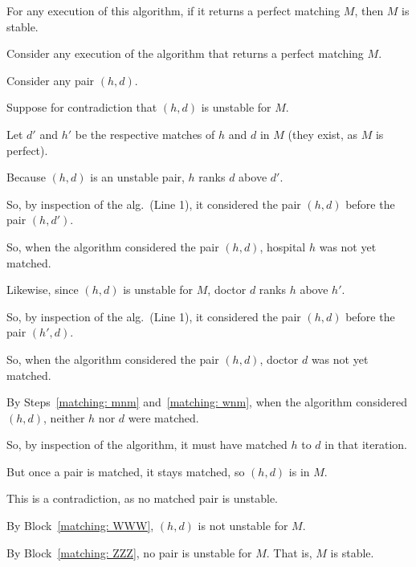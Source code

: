 \documentclass[11pt]{article}
\begin{document}
\begin{lemma}
  For any execution of this algorithm, if it returns a perfect matching $M$, then $M$ is stable.
\end{lemma}
\begin{longFormProof}
  \step Consider any execution of the algorithm that returns a perfect matching $M$.

  \begin{block}\label{matching: ZZZ}

    \step Consider any pair $(h, d)$.

    \begin{block}\label{matching: WWW}
      \step Suppose for contradiction that $(h, d)$ is unstable for $M$.
      
      \step Let $d'$ and $h'$ be the respective matches of $h$ and $d$ in $M$ (they exist, as $M$ is perfect).

      \step Because $(h, d)$ is an unstable pair, $h$ ranks $d$ above $d'$.

      \step So, by inspection of the alg.~(Line 1), it considered the pair $(h, d)$ before the pair $(h, d')$. 

      \step\label{matching: mnm} So, when the algorithm considered the pair $(h, d)$, hospital $h$ was not yet matched.

      \step Likewise, since $(h, d)$ is unstable for $M$, doctor $d$ ranks $h$ above $h'$.

      \step So, by inspection of the alg.~(Line 1), it considered the pair $(h, d)$ before the pair $(h', d)$. 

      \step\label{matching: wnm} So, when the algorithm considered the pair $(h, d)$, doctor $d$ was not yet matched.

      \step By Steps~\ref{matching: mnm} and~\ref{matching: wnm},
      when the algorithm considered $(h, d)$, neither $h$ nor $d$ were matched.

      \step So, by inspection of the algorithm, it must have matched $h$ to $d$ in that iteration.

      \step But once a pair is matched, it stays matched, so $(h, d)$ is in $M$.

      \step This is a contradiction, as no matched pair is unstable.
    \end{block}
    \step By Block~\ref{matching: WWW}, $(h, d)$ is not unstable for $M$. 
  \end{block}
  \step By Block~\ref{matching: ZZZ}, no pair is unstable for $M$.  That is, $M$ is stable.
\end{longFormProof}
\end{document}
